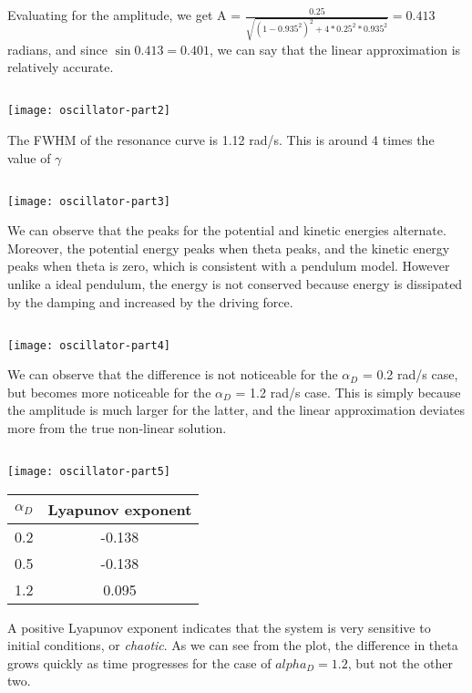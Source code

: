 \documentclass[10pt]{article}
\begin{document}
Evaluating for the amplitude, we get A = \( \frac{0.25}{\sqrt { (1-0.935^{2})^{2} + 4 * 0.25^{2} * 0.935^{2} }} = 0.413   \) radians, and since \(\sin 0.413 = 0.401\), we can say that the linear approximation is relatively accurate.
\subsection{}
\texttt{[image: oscillator-part2]}

The FWHM of the resonance curve is 1.12 rad/s. This is around 4 times the value of $ \gamma $

\subsection{}
\texttt{[image: oscillator-part3]}

We can observe that the peaks for the potential and kinetic energies alternate. Moreover, the potential energy peaks when theta peaks, and the kinetic energy peaks when theta is zero, which is consistent with a pendulum model. However unlike a ideal pendulum, the energy is not conserved because energy is dissipated by the damping and increased by the driving force.
\subsection{}
\texttt{[image: oscillator-part4]}

We can observe that the difference is not noticeable for the \(\alpha_{D}\) = 0.2 rad/s case, but becomes more noticeable for the \(\alpha_{D}\) = 1.2 rad/s case. This is simply because the amplitude is much larger for the latter, and the linear approximation deviates more from the true non-linear solution.

\subsection{}
\texttt{[image: oscillator-part5]}
\begin{center}
\begin{tabular}{ c c }
  $\alpha_{D}$ & Lyapunov exponent \\ \midrule
    0.2 & -0.138 \\
    0.5 & -0.138 \\
    1.2 & 0.095
\end{tabular}
\end{center}
A positive Lyapunov exponent indicates that the system is very sensitive to initial conditions, or \textit{chaotic}. As we can see from the plot, the difference in theta grows quickly as time progresses for the case of \(alpha_{D} = 1.2\), but not the other two.
\end{document}
